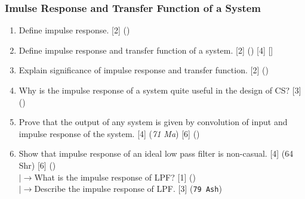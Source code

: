 \documentclass[12pt]{article}
\newcommand{\lb}{\\$\left|\rightarrow\right.$}
\begin{document}
    \subsubsection{Imulse Response and Transfer Function of a System}
      \begin{enumerate}
        \item Define impulse response. \hfill [2] ()

        \item Define impulse response and transfer function of a system. \hfill [2] () [4] []

        \item Explain significance of impulse response and transfer function. \hfill [2] ()

        \item Why is the impulse response of a system quite useful in the design of CS? \hfill [3] ()

        \item Prove that the output of any system is given by convolution of input and impulse response of the system. \hfill [4] (\textit{71 Ma}) [6] ()
        
        \item Show that impulse response of an ideal low pass filter is non-casual. \hfill [4] (64 Shr) [6] ()
        \lb What is the impulse response of LPF? \hfill [1] ()
        \lb Describe the impulse response of LPF. \hfill [3] (\texttt{79 Ash})
      \end{enumerate}
  
\end{document}
